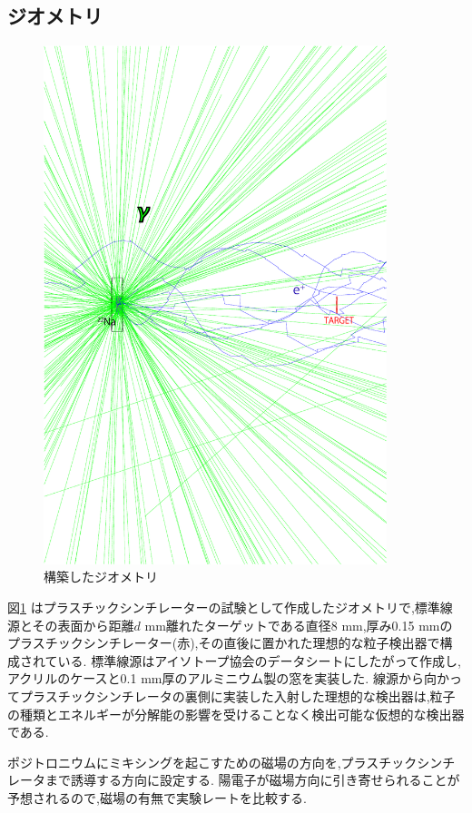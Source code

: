 \subsection{ジオメトリ}

\begin{figure}[htbp]
	\centering
		\includegraphics[width=10cm]{img/test1_geometry.pdf}
	\caption{構築したジオメトリ}
	\label{test1_geometry}
\end{figure}

図\ref{test1_geometry} はプラスチックシンチレーターの試験として作成したジオメトリで,標準線源とその表面から距離$d$ mm離れたターゲットである直径8 mm,厚み0.15 mmのプラスチックシンチレーター(赤),その直後に置かれた理想的な粒子検出器で構成されている.
標準線源はアイソトープ協会のデータシートにしたがって作成し,アクリルのケースと0.1 mm厚のアルミニウム製の窓を実装した.
線源から向かってプラスチックシンチレータの裏側に実装した入射した理想的な検出器は,粒子の種類とエネルギーが分解能の影響を受けることなく検出可能な仮想的な検出器である.

ポジトロニウムにミキシングを起こすための磁場の方向を,プラスチックシンチレータまで誘導する方向に設定する.
陽電子が磁場方向に引き寄せられることが予想されるので,磁場の有無で実験レートを比較する.

